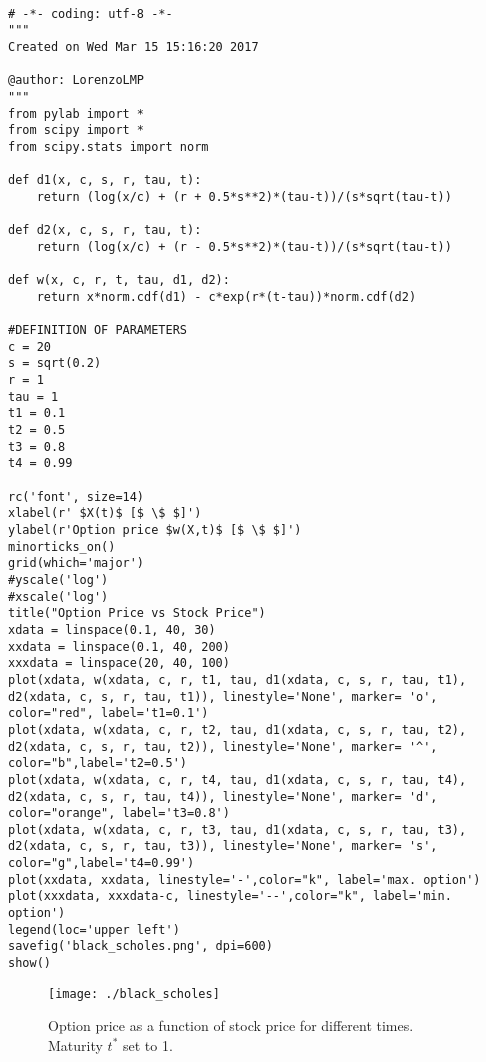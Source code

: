 \documentclass[11pt,letterpaper]{article}
\begin{document}
\begin{lstlisting}

# -*- coding: utf-8 -*-
"""
Created on Wed Mar 15 15:16:20 2017

@author: LorenzoLMP
"""
from pylab import *  
from scipy import * 
from scipy.stats import norm

def d1(x, c, s, r, tau, t):
    return (log(x/c) + (r + 0.5*s**2)*(tau-t))/(s*sqrt(tau-t))

def d2(x, c, s, r, tau, t):
    return (log(x/c) + (r - 0.5*s**2)*(tau-t))/(s*sqrt(tau-t))
    
def w(x, c, r, t, tau, d1, d2):
    return x*norm.cdf(d1) - c*exp(r*(t-tau))*norm.cdf(d2)

#DEFINITION OF PARAMETERS
c = 20
s = sqrt(0.2)
r = 1
tau = 1
t1 = 0.1
t2 = 0.5
t3 = 0.8
t4 = 0.99
    
rc('font', size=14)
xlabel(r' $X(t)$ [$ \$ $]')
ylabel(r'Option price $w(X,t)$ [$ \$ $]')
minorticks_on()
grid(which='major')
#yscale('log')
#xscale('log')
title("Option Price vs Stock Price")
xdata = linspace(0.1, 40, 30)
xxdata = linspace(0.1, 40, 200)
xxxdata = linspace(20, 40, 100)
plot(xdata, w(xdata, c, r, t1, tau, d1(xdata, c, s, r, tau, t1), d2(xdata, c, s, r, tau, t1)), linestyle='None', marker= 'o', color="red", label='t1=0.1')
plot(xdata, w(xdata, c, r, t2, tau, d1(xdata, c, s, r, tau, t2), d2(xdata, c, s, r, tau, t2)), linestyle='None', marker= '^', color="b",label='t2=0.5')
plot(xdata, w(xdata, c, r, t4, tau, d1(xdata, c, s, r, tau, t4), d2(xdata, c, s, r, tau, t4)), linestyle='None', marker= 'd', color="orange", label='t3=0.8')
plot(xdata, w(xdata, c, r, t3, tau, d1(xdata, c, s, r, tau, t3), d2(xdata, c, s, r, tau, t3)), linestyle='None', marker= 's', color="g",label='t4=0.99')
plot(xxdata, xxdata, linestyle='-',color="k", label='max. option')
plot(xxxdata, xxxdata-c, linestyle='--',color="k", label='min. option')
legend(loc='upper left')
savefig('black_scholes.png', dpi=600)
show()

\end{lstlisting}

\begin{figure}
\centering
\texttt{[image: ./black\_scholes]}
\caption{Option price as a function of stock price for different times. Maturity $ t^*$ set to 1.}
\label{fig:black_scholes}
\end{figure}
\end{document}
